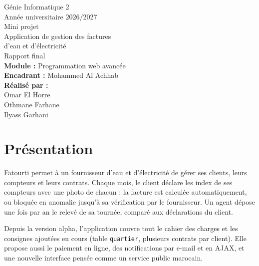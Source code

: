 \documentclass[11pt,a4paper]{article}
\begin{document}
\begin{center}
Génie Informatique 2\\[0.3em]
Année universitaire 2026/2027\\[2.5em]
{\Huge Mini projet}\\[0.8em]
{\Large Application de gestion des factures}\\[0.2em]
{\large d'eau et d'électricité}\\[2em]
{\Large Rapport final}\\[2.5em]
\textbf{Module :} Programmation web avancée\\[0.4em]
\textbf{Encadrant :} Mohammed Al Achhab\\[2.5em]
\textbf{Réalisé par :}\\[0.4em]
Omar El Horre\\ Othmane Farhane\\ Ilyass Garhani
\end{center}

\section*{Présentation}
Fatourti permet à un fournisseur d'eau et d'électricité de gérer ses clients, leurs compteurs et leurs contrats.
Chaque mois, le client déclare les index de ses compteurs avec une photo de chacun ; la facture est calculée
automatiquement, ou bloquée en anomalie jusqu'à sa vérification par le fournisseur. Un agent dépose une fois
par an le relevé de sa tournée, comparé aux déclarations du client.

Depuis la version alpha, l'application couvre tout le cahier des charges et les consignes ajoutées en cours
(table \texttt{quartier}, plusieurs contrats par client). Elle propose aussi le paiement en ligne, des
notifications par e-mail et en AJAX, et une nouvelle interface pensée comme un service public marocain.
\end{document}
